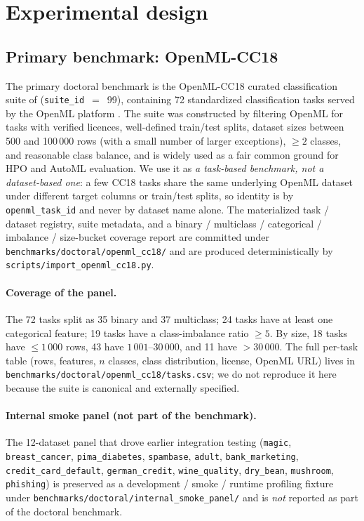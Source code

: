 \section{Experimental design}\label{sec:experimental-design}

\subsection{Primary benchmark: OpenML-CC18}
\label{sec:exp-datasets}
The primary doctoral benchmark is the OpenML-CC18 curated
classification suite of \citet{bischl2021openmlbenchmark}
(\texttt{suite\_id}~$=$~99), containing 72 standardized classification
tasks served by the OpenML platform \citep{vanschoren2014openml}. The
suite was constructed by filtering OpenML for tasks with verified
licences, well-defined train/test splits, dataset sizes between
500 and 100\,000 rows (with a small number of larger exceptions),
$\geq\!2$ classes, and reasonable class balance, and is widely used
as a fair common ground for HPO and AutoML evaluation. We use it as
\emph{a task-based benchmark, not a dataset-based one}: a few CC18
tasks share the same underlying OpenML dataset under different target
columns or train/test splits, so identity is by
\texttt{openml\_task\_id} and never by dataset name alone. The
materialized task / dataset registry, suite metadata, and a
binary / multiclass / categorical / imbalance / size-bucket coverage
report are committed under
\texttt{benchmarks/doctoral/openml\_cc18/} and are produced
deterministically by \texttt{scripts/import\_openml\_cc18.py}.

\paragraph{Coverage of the panel.} The 72 tasks split as 35 binary
and 37 multiclass; 24 tasks have at least one categorical feature;
19 tasks have a class-imbalance ratio $\geq\!5$. By size, 18 tasks
have $\leq\!1\,000$ rows, 43 have $1\,001$--$30\,000$, and 11 have
$>\!30\,000$. The full per-task table (rows, features, $n$ classes,
class distribution, license, OpenML URL) lives in
\texttt{benchmarks/doctoral/openml\_cc18/tasks.csv}; we do not
reproduce it here because the suite is canonical and externally
specified.

\paragraph{Internal smoke panel (not part of the benchmark).} The
12-dataset panel that drove earlier integration testing
(\texttt{magic}, \texttt{breast\_cancer}, \texttt{pima\_diabetes},
\texttt{spambase}, \texttt{adult}, \texttt{bank\_marketing},
\texttt{credit\_card\_default}, \texttt{german\_credit},
\texttt{wine\_quality}, \texttt{dry\_bean}, \texttt{mushroom},
\texttt{phishing}) is preserved as a development / smoke / runtime
profiling fixture under
\texttt{benchmarks/doctoral/internal\_smoke\_panel/} and is
\emph{not} reported as part of the doctoral benchmark.

